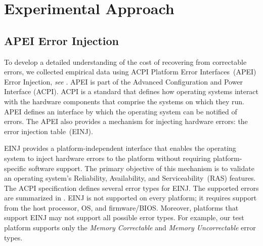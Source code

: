 
\section{Experimental Approach}
\label{sec:approach}

\subsection{APEI Error Injection}
To develop a detailed understanding of the cost of recovering from correctable 
errors, we collected empirical data using ACPI Platform Error Interfaces~(APEI) Error 
Injection, \emph{see} .  APEI is part of the 
Advanced Configuration and Power Interface (ACPI).  ACPI is a standard that defines how 
operating systems interact with the hardware components that comprise the systems on 
which they run.  APEI defines an interface by which the operating system can be notified 
of errors.  The APEI also provides a mechanism for injecting hardware errors: the error 
injection table~(EINJ).



EINJ provides a platform-independent interface that enables the operating system to
inject hardware errors to the platform without requiring platform-specific software 
support. The primary objective of this mechanism is to validate an operating system's 
Reliability, Availability, and Serviceability~(RAS) features.  The ACPI specification 
defines several error types for EINJ.  The supported errors are summarized in .  
EINJ is not supported on every platform; it requires support from the host processor, 
OS, and firmware/BIOS.  Moreover, platforms that support EINJ may not support all 
possible error types.  For example, our test platform supports only the \emph{Memory Correctable} 
and \emph{Memory Uncorrectable} error types.

